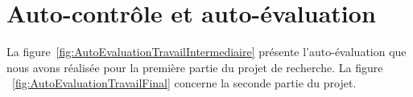 \documentclass[11pt, french,screen]{report-rd-info}
\begin{document}
\newpage
\printweeksummary
\chapter{Auto-contrôle et auto-évaluation}
La figure~\ref{fig:AutoEvaluationTravailIntermediaire} présente l'auto-évaluation que nous avons réalisée pour la première partie du projet de recherche. La figure ~\ref{fig:AutoEvaluationTravailFinal} concerne la seconde partie du projet.
\begin{figure}
	\centering
     \ifscreen %
     \else

\end{figure}
\end{document}
